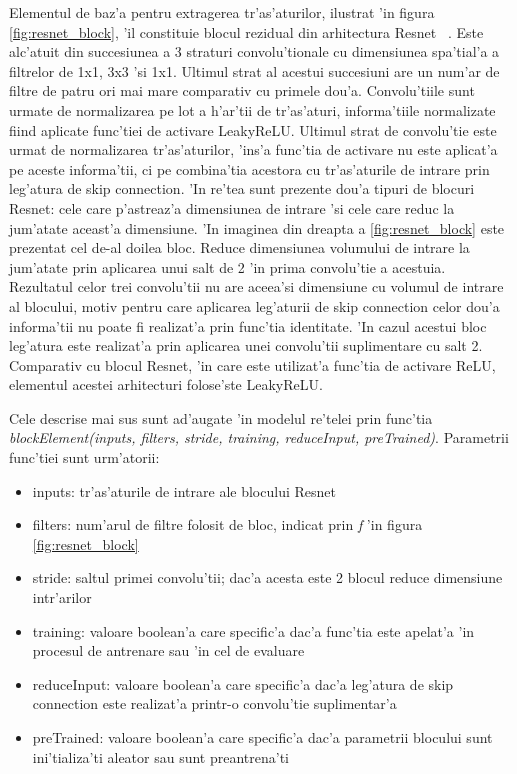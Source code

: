 \documentclass[12pt,a4paper,twoside]{report}
\begin{document}
Elementul de baz'a pentru extragerea tr'as'aturilor, ilustrat 'in figura \ref{fig:resnet_block}, 'il constituie blocul rezidual din arhitectura Resnet ~\cite{Resnet}. Este alc'atuit din succesiunea a 3 straturi convolu'tionale cu dimensiunea spa'tial'a a filtrelor de 1x1, 3x3 'si 1x1. Ultimul strat al acestui succesiuni are un num'ar de filtre de patru ori mai mare comparativ cu primele dou'a. Convolu'tiile sunt urmate de normalizarea pe lot a h'ar'tii de tr'as'aturi, informa'tiile normalizate fiind aplicate func'tiei de activare LeakyReLU. 
Ultimul strat de convolu'tie este urmat de normalizarea tr'as'aturilor, 'ins'a func'tia de activare nu este aplicat'a pe aceste informa'tii, ci pe combina'tia acestora cu tr'as'aturile de intrare prin leg'atura de skip connection. 'In re'tea sunt prezente dou'a tipuri de blocuri Resnet: cele care p'astreaz'a dimensiunea de intrare 'si cele care reduc la jum'atate aceast'a dimensiune. 'In imaginea din dreapta a \ref{fig:resnet_block} este prezentat cel de-al doilea bloc. Reduce dimensiunea volumului de intrare la jum'atate prin aplicarea unui salt de 2 'in prima convolu'tie a acestuia. Rezultatul celor trei convolu'tii nu are aceea'si dimensiune cu volumul de intrare al blocului, motiv pentru care aplicarea leg'aturii de skip connection celor dou'a informa'tii nu poate fi realizat'a prin func'tia identitate. 'In cazul acestui bloc leg'atura este realizat'a prin aplicarea unei convolu'tii suplimentare cu salt 2. Comparativ cu blocul Resnet, 'in care este utilizat'a func'tia de activare ReLU, elementul acestei arhitecturi folose'ste LeakyReLU.

Cele descrise mai sus sunt ad'augate 'in modelul re'telei prin func'tia \textit{blockElement(inputs, filters, stride, training, reduceInput, preTrained)}. Parametrii func'tiei sunt urm'atorii:
\begin{itemize}
\item inputs: tr'as'aturile de intrare ale blocului Resnet
\item filters: num'arul de filtre folosit de bloc, indicat prin \textit{f} 'in figura \ref{fig:resnet_block}
\item stride: saltul primei convolu'tii; dac'a acesta este 2 blocul reduce dimensiune intr'arilor
\item training: valoare boolean'a care specific'a dac'a func'tia este apelat'a 'in procesul de antrenare sau 'in cel de evaluare
\item reduceInput: valoare boolean'a care specific'a dac'a leg'atura de skip connection este realizat'a printr-o convolu'tie suplimentar'a
\item preTrained: valoare boolean'a care specific'a dac'a parametrii blocului sunt ini'tializa'ti aleator sau sunt preantrena'ti
\end{itemize}
\end{document}
